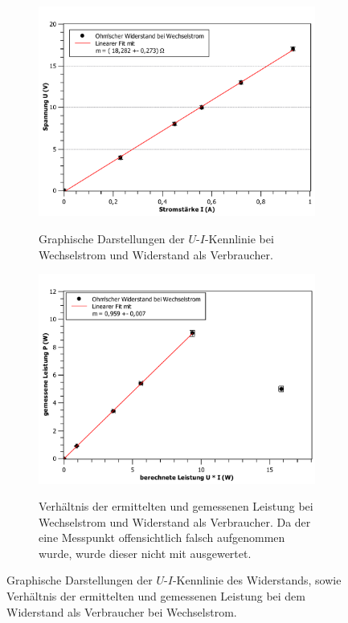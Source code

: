 \begin{figure}[ht]
	\centering	
	\begin{subfigure}{0.70\textwidth}
		\centering
		\includegraphics[width=\textwidth]{auswertung/widerstand_wechselstrom_Widerstand.pdf}
		\label{fig:3}
		\caption{Graphische Darstellungen der $U$-$I$-Kennlinie bei Wechselstrom und Widerstand als Verbraucher.}	
	\end{subfigure}
	\begin{subfigure}{0.70\textwidth}
		\centering
		\includegraphics[width=\textwidth]{auswertung/widerstand_wechselstrom_Leistung.pdf}
		\label{fig:4}
		\caption{Verhältnis der ermittelten und gemessenen Leistung bei Wechselstrom und Widerstand als Verbraucher. Da der eine Messpunkt offensichtlich falsch aufgenommen wurde, wurde dieser nicht mit ausgewertet.}	
	\end{subfigure}
	\caption{Graphische Darstellungen der $U$-$I$-Kennlinie des Widerstands, sowie Verhältnis der ermittelten und gemessenen Leistung bei dem Widerstand als Verbraucher bei Wechselstrom.}
\end{figure}


